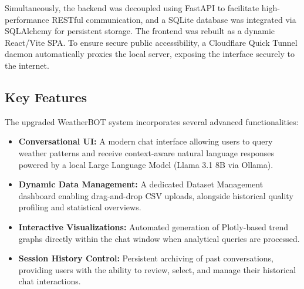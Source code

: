\documentclass[12pt]{article}
\begin{document}
Simultaneously, the backend was decoupled using FastAPI to facilitate high-performance RESTful communication, and a SQLite database was integrated via SQLAlchemy for persistent storage. The frontend was rebuilt as a dynamic React/Vite SPA. To ensure secure public accessibility, a Cloudflare Quick Tunnel daemon automatically proxies the local server, exposing the interface securely to the internet.

\subsection{Key Features}
The upgraded WeatherBOT system incorporates several advanced functionalities:
\begin{itemize}
    \item \textbf{Conversational UI:} A modern chat interface allowing users to query weather patterns and receive context-aware natural language responses powered by a local Large Language Model (Llama 3.1 8B via Ollama).
    \item \textbf{Dynamic Data Management:} A dedicated Dataset Management dashboard enabling drag-and-drop CSV uploads, alongside historical quality profiling and statistical overviews.
    \item \textbf{Interactive Visualizations:} Automated generation of Plotly-based trend graphs directly within the chat window when analytical queries are processed.
    \item \textbf{Session History Control:} Persistent archiving of past conversations, providing users with the ability to review, select, and manage their historical chat interactions.
\end{itemize}
\end{document}
